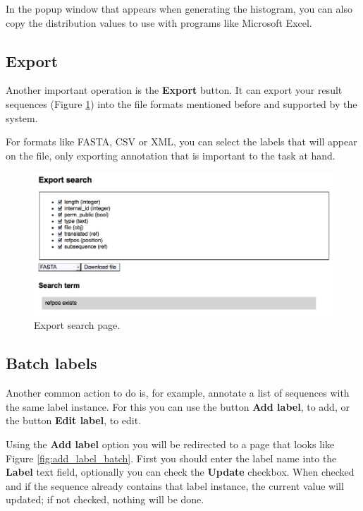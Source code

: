 In the popup window that appears when generating the histogram, you can also copy the distribution values
to use with programs like Microsoft Excel.

\subsection{Export}

Another important operation is the \textbf{Export} button.
It can export your result sequences (Figure \ref{fig:export_search})
into the file formats mentioned before and supported by the system.

For formats like FASTA, CSV or XML, you can select the labels that will appear on the file, only exporting annotation 
that is important to the task at hand.

\begin{figure}[ht]
  \centering
    \includegraphics[scale=0.4]{export_search.png}
  \caption{Export search page.}
  \label{fig:export_search}
\end{figure}

\subsection{Batch labels}

Another common action to do is, for example, annotate a list of sequences with the same label instance.
For this you can use the button \textbf{Add label}, to add, or the button \textbf{Edit label}, to edit.

Using the \textbf{Add label} option you will be redirected to a page that looks like Figure \ref{fig:add_label_batch}.
First you should enter the label name into the \textbf{Label} text field, optionally you can check the \textbf{Update}
checkbox. When checked and if the sequence already contains that label instance, the current value will updated; if not
checked, nothing will be done.

